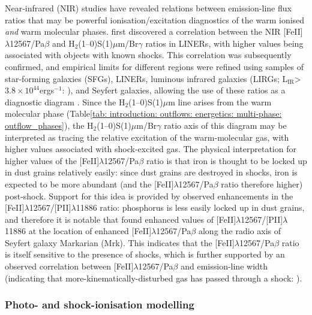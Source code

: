 Near-infrared (NIR) studies have revealed relations between emission-line flux ratios that may be powerful ionisation/excitation diagnostics of the warm ionised \textit{and} warm molecular phases. \citet{Larkin1998} first discovered a correlation between the NIR [FeII]$\lambda$12567/Pa$\beta$ and H$_2$(1--0)S(1)\;$\mu$m/Br$\gamma$ ratios in LINERs, with higher values being associated with objects with known shocks. This correlation was subsequently confirmed, and empirical limits for different regions were refined using samples of star-forming galaxies (SFGs), LINERs, luminous infrared galaxies (LIRGs; L$_\mathrm{IR}$\;\textgreater\;$3.8\times10^{44}$\;erg\;s$^{-1}$: \citealt{Sanders1996}), and Seyfert galaxies, allowing the use of these ratios as a diagnostic diagram \citep{Rodriguez-Ardila2005, Riffel2013a, Colina2015, Riffel2021}. Since the H$_2$(1--0)S(1)\;$\mu$m line arises from the warm molecular phase (Table\;\ref{tab: introduction: outflows: energetics: multi-phase: outflow_phases}), the H$_2$(1--0)S(1)\;$\mu$m/Br$\gamma$ ratio axis of this diagram may be interpreted as tracing the relative excitation of the warm-molecular gas, with higher values associated with shock-excited gas. The physical interpretation for higher values of the [FeII]$\lambda$12567/Pa$\beta$ ratio is that iron is thought to be locked up in dust grains relatively easily: since dust grains are destroyed in shocks, iron is expected to be more abundant (and the [FeII]$\lambda$12567/Pa$\beta$ ratio therefore higher) post-shock. Support for this idea is provided by observed enhancements in the [FeII]$\lambda$12567/[PII]$\lambda$11886 ratio: phosphorus is less easily locked up in dust grains, and therefore it is notable that \citet{Riffel2013b} found enhanced values of [FeII]$\lambda$12567/[PII]$\lambda$11886 at the location of enhanced [FeII]$\lambda$12567/Pa$\beta$ along the radio axis of Seyfert galaxy Markarian (Mrk). This indicates that the [FeII]$\lambda$12567/Pa$\beta$ ratio is itself sensitive to the presence of shocks, which is further supported by an observed correlation between [FeII]$\lambda$12567/Pa$\beta$ and emission-line width (indicating that more-kinematically-disturbed gas has passed through a shock: \citealt{Riffel2021}).

\subsubsection{Photo- and shock-ionisation modelling}
\label{section: introduction: outflows: acceleration_mechanisms: modelling}


